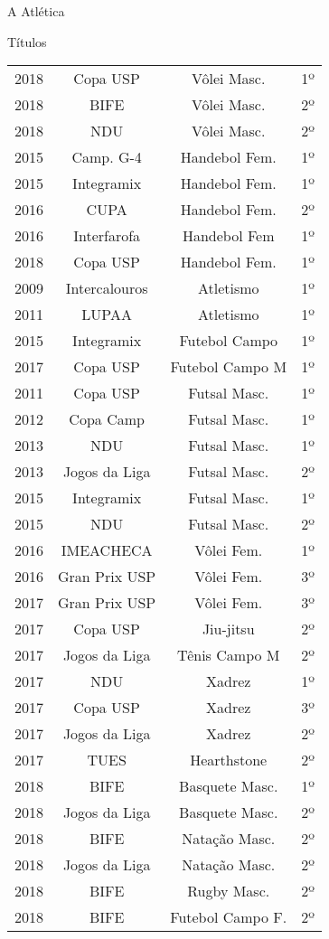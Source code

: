 \begin{secao}{A Atlética}
\begin{subsecao}{Títulos}
\begin{center}
\begin{tabular}{c|c|c|c}
    2018 & Copa USP       & Vôlei Masc.     & 1º\\
    2018 & BIFE           & Vôlei Masc.     & 2º\\
    2018 & NDU            & Vôlei Masc.    & 2º\\
    2015 & Camp. G-4      & Handebol Fem.   & 1º\\
    2015 & Integramix     & Handebol Fem.   & 1º\\
    2016 & CUPA           & Handebol Fem.   & 2º\\
    2016 & Interfarofa    & Handebol Fem    & 1º\\
    2018 & Copa USP       & Handebol Fem.   & 1º\\
    2009 & Intercalouros  & Atletismo       & 1º\\
    2011 & LUPAA          & Atletismo       & 1º\\
    2015 & Integramix     & Futebol Campo   & 1º\\
    2017 & Copa USP       & Futebol Campo M & 1º\\
    2011 & Copa USP       & Futsal Masc.    & 1º\\
    2012 & Copa Camp      & Futsal Masc.    & 1º\\
    2013 & NDU            & Futsal Masc.    & 1º\\
    2013 & Jogos da Liga  & Futsal Masc.    & 2º\\
    2015 & Integramix     & Futsal Masc.    & 1º\\
    2015 & NDU            & Futsal Masc.    & 2º\\
    2016 & IMEACHECA      & Vôlei Fem.      & 1º\\
    2016 & Gran Prix USP  & Vôlei Fem.      & 3º\\
    2017 & Gran Prix USP  & Vôlei Fem.      & 3º\\
    2017 & Copa USP       & Jiu-jitsu       & 2º\\
    2017 & Jogos da Liga  & Tênis Campo M   & 2º\\
    2017 & NDU            & Xadrez          & 1º\\
    2017 & Copa USP       & Xadrez          & 3º\\
    2017 & Jogos da Liga  & Xadrez          & 2º\\
    2017 & TUES           & Hearthstone     & 2º\\
    2018 & BIFE           & Basquete Masc.  & 1º\\
    2018 & Jogos da Liga  & Basquete Masc.  & 2º\\
    2018 & BIFE           & Natação Masc.   & 2º\\
    2018 & Jogos da Liga  & Natação Masc.   & 2º\\
    2018 & BIFE           & Rugby Masc.     & 2º\\
    2018 & BIFE           & Futebol Campo F.& 2º
  \end{tabular}
\end{center}


\end{subsecao}
\end{secao}
